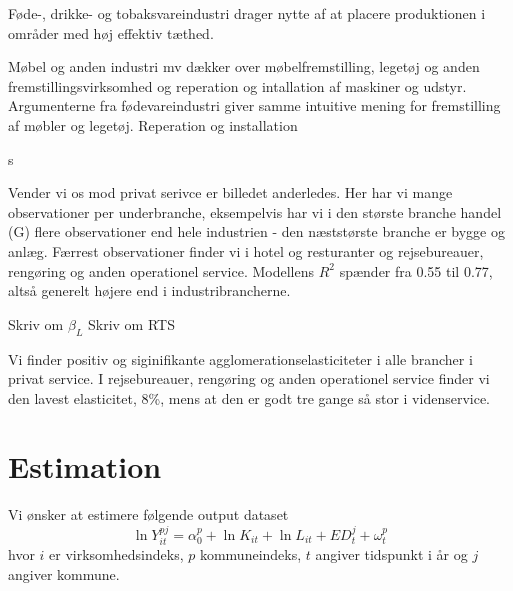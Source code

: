 \documentclass[a4paper, 12pt, titlepage]{article}
\begin{document}
Føde-, drikke- og tobaksvareindustri drager nytte af at placere produktionen i områder med høj effektiv tæthed. 

Møbel og anden industri mv dækker over møbelfremstilling, legetøj og anden fremstillingsvirksomhed og reperation og intallation af maskiner og udstyr. Argumenterne fra fødevareindustri giver samme intuitive mening for fremstilling af møbler og legetøj. Reperation og installation 



s

Vender vi os mod privat serivce er billedet anderledes. Her har vi mange observationer per underbranche, eksempelvis har vi i den største branche handel (G) flere observationer end hele industrien - den næststørste branche er bygge og anlæg. Færrest observationer finder vi i hotel og resturanter og rejsebureauer, rengøring og anden operationel service. Modellens $R^2$ spænder fra 0.55 til 0.77, altså generelt højere end i industribrancherne. 


Skriv om $\beta_L$
Skriv om RTS


Vi finder positiv og siginifikante agglomerationselasticiteter i alle brancher i privat service. I rejsebureauer, rengøring og anden operationel service finder vi den lavest elasticitet, 8\%, mens at den er godt tre gange så stor i videnservice. 








\section{Estimation}
Vi ønsker at estimere følgende output dataset
\begin{equation}
	\ln Y_{it}^{pj} = \alpha^p_0 + \ln K_{it} + \ln L_{it} + ED^j_{t} + \omega^p_{t}
\end{equation}
hvor $i$ er virksomhedsindeks, $p$ kommuneindeks, $t$ angiver tidspunkt i år og $j$ angiver kommune. 

\end{document}

